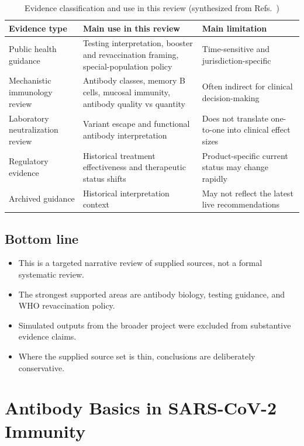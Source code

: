 \documentclass[12pt]{article}
\begin{document}
\begin{table}[H]
\centering
\caption{Evidence classification and use in this review (synthesized from Refs.~\cite{ref1,ref2,ref3,ref4,ref5,ref6,ref8,ref9,ref12})}
\begin{tabularx}{\textwidth}{>{\raggedright\arraybackslash}p{3.2cm} >{\raggedright\arraybackslash}X >{\raggedright\arraybackslash}p{3.2cm}}
\toprule
Evidence type & Main use in this review & Main limitation \\
\midrule
Public health guidance & Testing interpretation, booster and revaccination framing, special-population policy & Time-sensitive and jurisdiction-specific \\
Mechanistic immunology review & Antibody classes, memory B cells, mucosal immunity, antibody quality vs quantity & Often indirect for clinical decision-making \\
Laboratory neutralization review & Variant escape and functional antibody interpretation & Does not translate one-to-one into clinical effect sizes \\
Regulatory evidence & Historical treatment effectiveness and therapeutic status shifts & Product-specific current status may change rapidly \\
Archived guidance & Historical interpretation context & May not reflect the latest live recommendations \\
\bottomrule
\end{tabularx}
\end{table}

\subsection*{Bottom line}
\begin{itemize}[leftmargin=1.5em]
    \item This is a targeted narrative review of supplied sources, not a formal systematic review.
    \item The strongest supported areas are antibody biology, testing guidance, and WHO revaccination policy.
    \item Simulated outputs from the broader project were excluded from substantive evidence claims.
    \item Where the supplied source set is thin, conclusions are deliberately conservative.
\end{itemize}

\section{Antibody Basics in SARS-CoV-2 Immunity}
\end{document}
